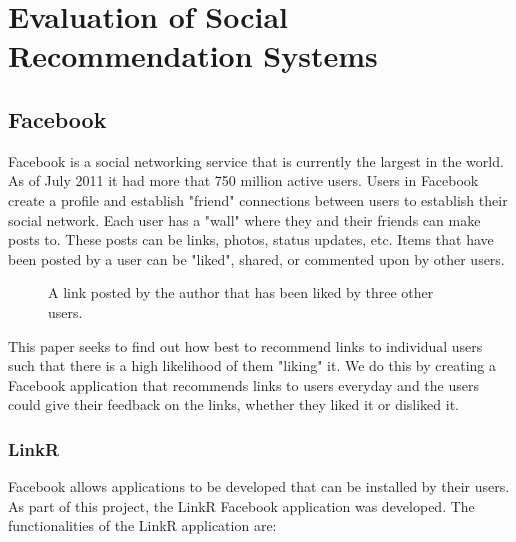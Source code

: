 
\chapter{Evaluation of Social Recommendation Systems}

\section{Facebook}

Facebook is a social networking service that is currently the largest in the world. As of July 2011 it had more that 750 million active users. Users in Facebook create a profile and establish "friend" connections between users to establish their social network. Each user has a "wall" where they and their friends can make posts to. These posts can be links, photos, status updates, etc. Items that have been posted by a user can be "liked", shared, or commented upon by other users. 

\begin{figure}[h]
\centering
\caption{A link posted by the author that has been liked by three other users.}
\end{figure}

This paper seeks to find out how best to recommend links to individual users such that there is a high likelihood of them "liking" it. We do this by creating a Facebook application that recommends links to users everyday and the users could give their feedback on the links, whether they liked it or disliked it. 

\subsection{LinkR}
Facebook allows applications to be developed that can be installed by their users. As part of this project, the LinkR Facebook application was developed. The functionalities of the LinkR application are:

